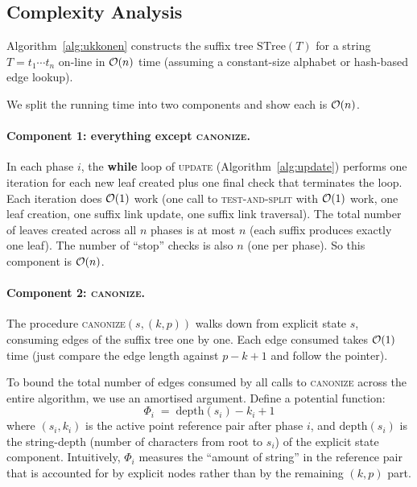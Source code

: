 \subsection{Complexity Analysis}

\begin{theorem}[Ukkonen, 1995]
  \label{thm:ukkonen-linear}
  Algorithm~\ref{alg:ukkonen} constructs the suffix tree
  $\mathrm{STree}(T)$ for a string $T = t_1 \cdots t_n$ on-line
  in $\mathcal{O}\!\left(n\right)$ time (assuming a constant-size alphabet or hash-based
  edge lookup).
\end{theorem}

\begin{formaldetails}

We split the running time into two components and show each is $\mathcal{O}\!\left(n\right)$.

\paragraph{Component 1: everything except \textsc{canonize}.}
In each phase $i$, the \textbf{while} loop of \textsc{update}
(Algorithm~\ref{alg:update}) performs one iteration for each new leaf
created plus one final check that terminates the loop.
Each iteration does $\mathcal{O}\!\left(1\right)$ work (one call to \textsc{test-and-split}
with $\mathcal{O}\!\left(1\right)$ work, one leaf creation, one suffix link update, one
suffix link traversal).
The total number of leaves created across all $n$ phases is at most
$n$ (each suffix produces exactly one leaf).
The number of ``stop'' checks is also $n$ (one per phase).
So this component is $\mathcal{O}\!\left(n\right)$.

\paragraph{Component 2: \textsc{canonize}.}
The procedure \textsc{canonize}$(s, (k, p))$ walks down from
explicit state $s$, consuming edges of the suffix tree one by one.
Each edge consumed takes $\mathcal{O}\!\left(1\right)$ time (just compare the edge length
against $p - k + 1$ and follow the pointer).

To bound the total number of edges consumed by all calls to
\textsc{canonize} across the entire algorithm, we use an amortised
argument.
Define a potential function:
\[
  \Phi_i \;=\; \mathrm{depth}(s_i) - k_i + 1
\]
where $(s_i, k_i)$ is the active point reference pair after phase $i$,
and $\mathrm{depth}(s_i)$ is the string-depth (number of characters
from root to $s_i$) of the explicit state component.
Intuitively, $\Phi_i$ measures the ``amount of string'' in the
reference pair that is accounted for by explicit nodes rather than
by the remaining $(k, p)$ part.


\end{formaldetails}
